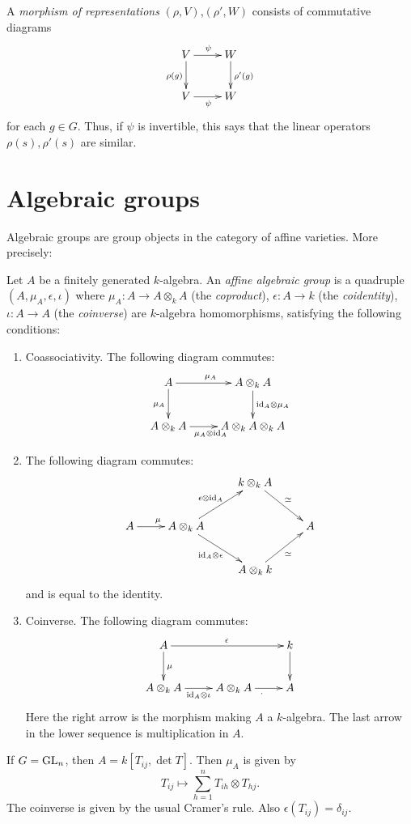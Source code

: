 \documentclass[11pt, english]{article}
\begin{document}
A \emph{morphism of representations} $(\rho,V)$,$(\rho',W)$ consists of commutative diagrams
\[
\xymatrix{
V \ar[r]^{\psi} \ar[d]_{\rho(g)}& W \ar[d]^{\rho'(g)} \\
V \ar[r]_{\psi} & W
}
\]
for each $g \in G$. Thus, if $\psi$ is invertible, this says that the linear operators $\rho(s),\rho'(s)$ are similar.

\section{Algebraic groups}

Algebraic groups are group objects in the category of affine varieties. More precisely:

\begin{defi}
\label{defalggrp}
Let $A$ be a finitely generated $k$-algebra. An \emph{affine algebraic group} is a quadruple $(A,\mu_A,\epsilon,\iota)$ where $\mu_A:A \to A \otimes_k A$ (the \emph{coproduct}), $\epsilon:A \to k$ (the \emph{coidentity}), $\iota: A \to A$ (the \emph{coinverse}) are $k$-algebra homomorphisms, satisfying the following conditions:
\begin{enumerate}
\item Coassociativity. The following diagram commutes:
\[
\xymatrix{
A \ar[r]^{\mu_A} \ar[d]_{\mu_A} & A \otimes_k A \ar[d]^{\id_A \otimes \mu_A} \\
A \otimes_k A \ar[r]_{\mu_A \otimes \id_A} & A \otimes_k A \otimes_k A
}
\]
\item The following diagram commutes:
\[
\xymatrix{
 & & k \otimes_k A  \ar[dr]^{\simeq} \\
A \ar[r]^\mu & A \otimes_k A \ar[ur]^{\epsilon \otimes \id_A} \ar[dr]_{\id_A \otimes \epsilon}  & & A \\
 & & A \otimes_k k \ar[ur]_{\simeq}
 }
\]
and is equal to the identity.
\item Coinverse. The following diagram commutes:
\[
\xymatrix{
A \ar[d]^\mu \ar[rr]^\epsilon & & k \ar[d] \\
A \otimes_k A \ar[r]_{\id_A \otimes \iota} & A \otimes_k A \ar[r]_\cdot & A
}
\]
Here the right arrow is the morphism making $A$ a $k$-algebra. The last arrow in the lower sequence is multiplication in $A$.
\end{enumerate}
\end{defi}

\begin{example}
If $G=\operatorname{GL}_n$, then $A=k[T_{ij},\det T]$. Then $\mu_A$ is given by
\[
T_{ij} \mapsto \sum_{h=1}^n T_{ih} \otimes T_{hj}.
\]
The coinverse is given by the usual Cramer's rule. Also $\epsilon(T_{ij})=\delta_{ij}$.
\end{example}
\end{document}
